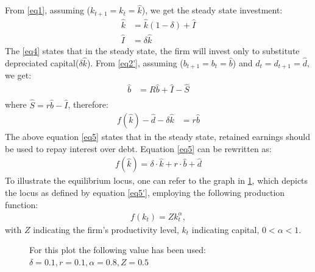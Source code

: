 \documentclass[12pt]{report}
\begin{document}
From \ref{eq1}, assuming (\(k_{t+1}=k_{t}=\widehat{k}\)), we get the steady state investment:%
\begin{align}
    \widehat{k}&=\widehat{k}\left(1-\delta\right) + \widehat{I} \nonumber\\
    \widehat{I}&=\delta \widehat{k}  \label{eq4}
\end{align}
The \ref{eq4} states that in the steady state, the firm will invest only to substitute depreciated capital(\(\delta
\widehat{k}\)). From \ref{eq2'},  assuming (\(b_{t+1}=b_{t} = \widehat{b}\)) and \(d_t=d_{t+1}=\hat{d} \), we get:
\begin{align}
    \widehat{b} &= R \widehat{b} + \widehat{I} - \widehat{S} \nonumber \\
\end{align}
where \(\widehat{S} = r \widehat{b} - \widehat{I}  \), therefore:
\begin{align}
    f\left(\widehat{k}\right) - \widehat{d} - \delta \widehat{k} &= r \widehat{b} \label{eq5}
\end{align}
The above equation \ref{eq5} states that in the steady state, retained earnings should be used to repay
interest over debt.
Equation \ref{eq5} can be rewritten as:
\begin{align}
    f(\widehat{k}) = \delta \cdot \widehat{k} + r \cdot \widehat{b} + \widehat{d} \label{eq5'}
\end{align}
To illustrate the equilibrium locus, one can refer to the graph in \ref{fig:steadystate3d},
which depicts the locus as defined by equation \ref{eq5'}, employing the following production function:
\begin{align}
    f(k_{t}) = Z  k_{t}^\alpha, \label{eq6} 
\end{align}
 with \(Z\) indicating the firm's productivity level, \(k_t\) indicating capital, \(0<\alpha<1\).  

\begin{figure}
    \centering
    
    \caption{For this plot the following value has been used: \(\delta =0.1, r=0.1, \alpha=0.8, Z=0.5\)}
    \label{fig:steadystate3d}
\end{figure}
\end{document}
